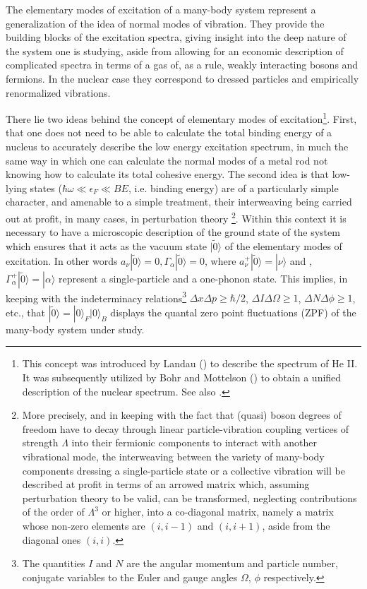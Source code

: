 The elementary modes of excitation  of a many-body system  represent a generalization of  the idea of normal modes of vibration.
They provide the building blocks of the excitation spectra, giving  insight  into the  deep nature  of the system one is studying, aside from allowing 
for an economic description  of complicated spectra in terms of a gas of, as a rule, weakly interacting bosons and fermions. In the nuclear case 
they correspond to dressed particles and empirically renormalized vibrations.

There lie two ideas behind the concept of elementary modes of excitation\footnote{This concept was introduced by Landau (\cite{Landau:41}) to describe the spectrum of He II. It was subsequently utilized by Bohr and Mottelson (\cite{Bohr:75}) to obtain a unified description of the nuclear spectrum. See also \cite{terHaar:65,terHaar:69}.}. First, that one does not need to be able to calculate the total binding
energy  of a nucleus to accurately describe the low energy excitation spectrum, in much the same way in which one can calculate 
the normal modes of a metal rod not knowing how to  calculate its total cohesive energy.
The second idea is that low-lying states ($\hbar \omega \ll \epsilon_F \ll BE$, i.e. binding energy) are of a particularly simple
character, and  amenable to a simple treatment, their
interweaving  being carried out at profit, in many cases,  in perturbation theory
\footnote{More precisely, and in keeping with  the fact that (quasi)
boson degrees of freedom have to decay through linear particle-vibration 
coupling vertices of strength $\Lambda$ into their fermionic components to interact with another vibrational mode,
the interweaving between the variety of many-body components dressing a single-particle state 
or a collective vibration will be described at profit in terms of an arrowed matrix which, assuming perturbation theory
to be valid, can be transformed, neglecting contributions of the order of $\Lambda^3$ or higher, into a co-diagonal matrix, namely a matrix 
whose non-zero elements are $(i,i-1)$ and $(i,i+1)$,  aside from  the diagonal ones $(i,i)$.}. 
Within this context it is  necessary to have a microscopic description 
of the ground  state of the system  which ensures that it acts as the vacuum state 
$|\tilde0\rangle  $ of the elementary modes of excitation. In other words $a_{\nu}|\tilde 0 \rangle   = 0, \Gamma_{\alpha} |\tilde 0\rangle   =0$, where
$a^+_{\nu}|\tilde 0 \rangle   = |\nu\rangle  $ and , $\Gamma^+_{\alpha} |\tilde 0\rangle   =|\alpha\rangle  $ represent a single-particle and a one-phonon state.
This   implies, in keeping 
with the indeterminacy  relations\footnote{The quantities $I$ and $N$   are the angular momentum and particle number, conjugate variables to the Euler and gauge angles $\Omega$, $\phi$ respectively.} $\Delta x \Delta p \geq \hbar/2$, $\Delta I \Delta \Omega \geq 1$, $\Delta N \Delta \phi \geq 1$, etc.,  that $|\tilde 0\rangle   = |0\rangle  _F |0\rangle  _B$
displays the  quantal zero point fluctuations (ZPF) of the many-body system under study.

